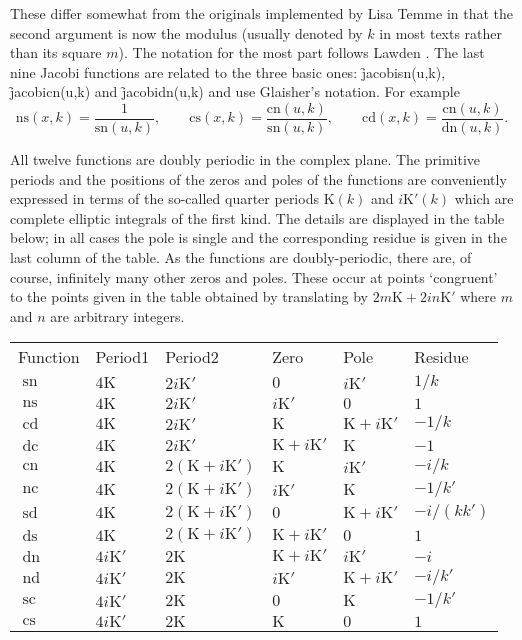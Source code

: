 These differ somewhat from the originals implemented by Lisa Temme in that
the second argument is now the modulus (usually denoted by $k$ in most texts
rather than its square $m$).  The notation for the most part follows  Lawden
\cite{Lawden:89}. The last nine Jacobi functions are related to the three
basic ones: \f{jacobisn(u,k)}, \f{jacobicn(u,k)} and \f{jacobidn(u,k)} and
use Glaisher's notation. For example
\[ \mathrm{ns}(x,k) = \frac{1}{\mathrm{sn}(u,k)}, \qquad
\mathrm{cs}(x,k) = \frac{\mathrm{cn}(u,k)}{\mathrm{sn}(u,k)}, \qquad
\mathrm{cd}(x,k) = \frac{\mathrm{cn}(u,k)}{\mathrm{dn}(u,k)}. \]

All twelve functions are doubly periodic in the complex plane.
The primitive periods and the positions of the zeros and poles of the
functions are conveniently expressed in terms of the so-called quarter periods
$\mathrm{K}(k)$ and $i\mathrm{K}'(k)$ which are complete elliptic
integrals of the first kind. The details are displayed in the table below;
in all cases the pole is single and the corresponding residue is given in
the last column of the table.
As the functions are doubly-periodic, there are, of course, infinitely many
other zeros and poles. These occur at points `congruent' to the points
given in the table obtained by translating by
$2m\mathrm{K} +2i n\mathrm{K}'$ where $m$ and $n$ are arbitrary integers.

\begin{tabular}{llllll}
  Function & Period1 & Period2 & Zero & Pole & Residue\\
$\mathop{\mathrm{sn}}$&$4\mathrm{K}$&$2i\mathrm{K}'$&$0$&$i\mathrm{K}'$&$1/k$\\
$\mathop{\mathrm{ns}}$&$4\mathrm{K}$&$2i\mathrm{K}'$&$i\mathrm{K}'$&$0$&$1$\\
$\mathop{\mathrm{cd}}$&$4\mathrm{K}$&$2i\mathrm{K}'$&$\mathrm{K}$&$\mathrm{K}+i\mathrm{K}'$&$-1/k$\\  
$\mathop{\mathrm{dc}}$&$4\mathrm{K}$&$2i\mathrm{K}'$&$\mathrm{K}+i\mathrm{K}'$&$\mathrm{K}$&$-1$\\ 

$\mathop{\mathrm{cn}}$&$4\mathrm{K}$&$2(\mathrm{K}+i\mathrm{K}')$&$\mathrm{K}$&$i\mathrm{K}'$&$-i/k$\\
$\mathop{\mathrm{nc}}$&$4\mathrm{K}$&$2(\mathrm{K}+i\mathrm{K}')$&$i\mathrm{K}'$&$\mathrm{K}$&$-1/k'$\\
$\mathop{\mathrm{sd}}$&$4\mathrm{K}$&$2(\mathrm{K}+i\mathrm{K}')$&$0$&$\mathrm{K}+i\mathrm{K}'$&$-i/(k k')$\\
$\mathop{\mathrm{ds}}$&$4\mathrm{K}$&$2(\mathrm{K}+i\mathrm{K}')$&$\mathrm{K}+i\mathrm{K}'$&$0$&$1$\\

$\mathop{\mathrm{dn}}$&$4i\mathrm{K}'$&$2\mathrm{K}$&$\mathrm{K}+i\mathrm{K}'$&$i\mathrm{K}'$&$-i$\\
$\mathop{\mathrm{nd}}$&$4i\mathrm{K}'$&$2\mathrm{K}$&$i\mathrm{K}'$&$\mathrm{K}+i\mathrm{K}'$&$-i/k'$\\
$\mathop{\mathrm{sc}}$&$4i\mathrm{K}'$&$2\mathrm{K}$&$0$&$\mathrm{K}$&$-1/k'$\\
$\mathop{\mathrm{cs}}$&$4i\mathrm{K}'$&$2\mathrm{K}$&$\mathrm{K}$&$0$&$1$\\
\end{tabular}

